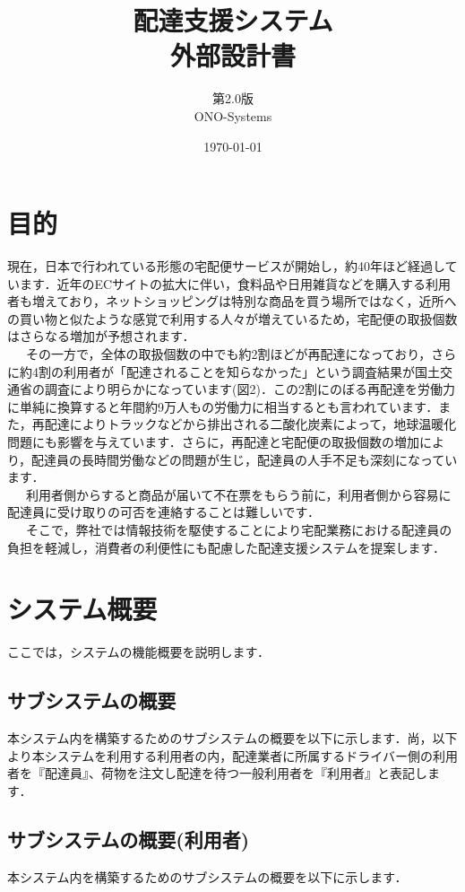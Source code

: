 \documentclass[a4j,titlepage]{jarticle}
\title{\huge 配達支援システム\\
		外部設計書}
\author{第2.0版\\
        ONO-Systems\\}
\date{\today}
\begin{document}
\maketitle

\tableofcontents
\clearpage

\section{目的}
現在，日本で行われている形態の宅配便サービスが開始し，約40年ほど経過しています．近年のECサイトの拡大に伴い，食料品や日用雑貨などを購入する利用者も増えており，ネットショッピングは特別な商品を買う場所ではなく，近所への買い物と似たような感覚で利用する人々が増えているため，宅配便の取扱個数はさらなる増加が予想されます\cite{ref1}．\\
\ \ \ その一方で，全体の取扱個数の中でも約2割ほどが再配達になっており，さらに約4割の利用者が「配達されることを知らなかった」という調査結果が国土交通省の調査により明らかになっています(図2)．この2割にのぼる再配達を労働力に単純に換算すると年間約9万人もの労働力に相当するとも言われています．また，再配達によりトラックなどから排出される二酸化炭素によって，地球温暖化問題にも影響を与えています．さらに，再配達と宅配便の取扱個数の増加により，配達員の長時間労働などの問題が生じ，配達員の人手不足も深刻になっています\cite{ref1}．\\
\ \ \ 利用者側からすると商品が届いて不在票をもらう前に，利用者側から容易に配達員に受け取りの可否を連絡することは難しいです．\\
\ \ \ そこで，弊社では情報技術を駆使することにより宅配業務における配達員の負担を軽減し，消費者の利便性にも配慮した配達支援システムを提案します．

\section{システム概要}
ここでは，システムの機能概要を説明します．

\subsection{サブシステムの概要}
本システム内を構築するためのサブシステムの概要を以下に示します．尚，以下より本システムを利用する利用者の内，配達業者に所属するドライバー側の利用者を『配達員』、荷物を注文し配達を待つ一般利用者を『利用者』と表記します．

\subsection{サブシステムの概要(利用者)}
本システム内を構築するためのサブシステムの概要を以下に示します．
\end{document}
